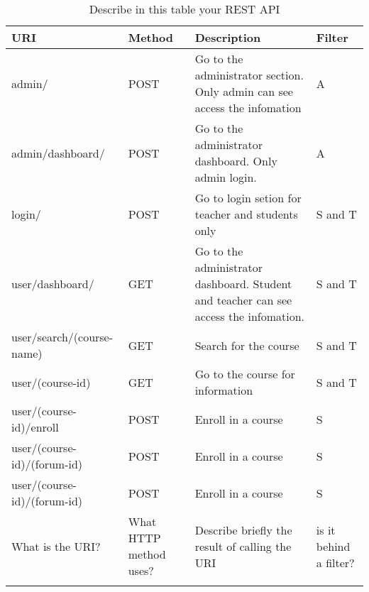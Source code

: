 \begin{longtable}{|p{}|p{} |p{}|p{}|} 

\hline
\textbf{URI} & \textbf{Method} & \textbf{Description} & \textbf{Filter} \\

\hline
admin/   
&   %
POST
&   %
Go to the administrator section. Only admin can see access the infomation
&   %
A\\
\hline

\hline
admin/dashboard/
&   %
POST
&   %
Go to the administrator dashboard. Only admin login.
&   %
A\\
\hline

\hline
login/   
&   %
POST
&   %
Go to login setion for teacher and students only
&   %
S and T\\
\hline

\hline
user/dashboard/
&   %
GET
&   %
Go to the administrator dashboard. Student and teacher can see access the infomation.
&   %
S and T\\
\hline

\hline
user/search/(course-name)
&   %
GET
&   %
Search for the course
&   %
S and T\\
\hline

\hline
user/(course-id) 
&   %
GET
&   %
Go to the course for information
&   %
S and T\\
\hline

\hline
user/(course-id)/enroll
&   %
POST
&   %
Enroll in a course
&   %
S\\
\hline

\hline
user/(course-id)/(forum-id)
&   %
POST
&   %
Enroll in a course
&   %
S\\
\hline

\hline
user/(course-id)/(forum-id)
&   %
POST
&   %
Enroll in a course
&   %
S\\
\hline

What is the URI? & What HTTP method uses? &  Describe briefly the result of calling the URI & is it behind a filter?\\

\hline


\caption{Describe in this table your REST API}
\label{tab:termGlossary}
\end{longtable}